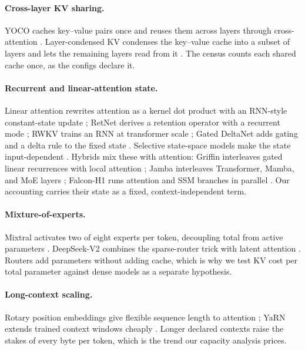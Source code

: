 \paragraph{Cross-layer KV sharing.}
YOCO caches key--value pairs once and reuses them across layers through
cross-attention \cite{sun2024yoco}. Layer-condensed KV condenses the key--value cache into a subset of layers
and lets the remaining layers read from it \cite{wu2024cla}.
The census counts each shared cache once, as the configs declare it.

\paragraph{Recurrent and linear-attention state.}
Linear attention rewrites attention as a kernel dot product with an RNN-style
constant-state update \cite{katharopoulos2020linear}; RetNet derives a retention
operator with a recurrent mode \cite{sun2023retnet}; RWKV trains an RNN at
transformer scale \cite{peng2023rwkv}; Gated DeltaNet adds gating and a delta
rule to the fixed state \cite{yang2024gdn}. Selective state-space models make
the state input-dependent \cite{gu2023mamba}. Hybrids mix these with attention:
Griffin interleaves gated linear recurrences with local attention
\cite{de2024griffin}; Jamba interleaves Transformer, Mamba, and MoE layers
\cite{lieber2024jamba}; Falcon-H1 runs attention and SSM branches in parallel
\cite{zuo2025falcon}. Our accounting carries their state as a fixed,
context-independent term.

\paragraph{Mixture-of-experts.}
Mixtral activates two of eight experts per token, decoupling total from active
parameters \cite{jiang2024mixtral}. DeepSeek-V2 combines the sparse-router
trick with latent attention \cite{deepseekai2024v2}. Routers add parameters
without adding cache, which is why we test KV cost per total parameter against
dense models as a separate hypothesis.

\paragraph{Long-context scaling.}
Rotary position embeddings give flexible sequence length to attention
\cite{su2021roformer}; YaRN extends trained context windows cheaply
\cite{peng2023yarn}. Longer declared contexts raise the stakes of every byte
per token, which is the trend our capacity analysis prices.

